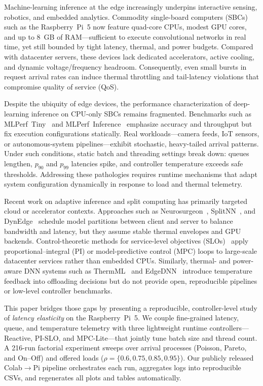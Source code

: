 \documentclass[acmsmall]{acmart}
\begin{document}
Machine-learning inference at the edge increasingly underpins interactive sensing, robotics, and embedded analytics. Commodity single-board computers (SBCs) such as the Raspberry~Pi~5 now feature quad-core CPUs, modest GPU cores, and up to 8~GB of RAM—sufficient to execute convolutional networks in real time, yet still bounded by tight latency, thermal, and power budgets. Compared with datacenter servers, these devices lack dedicated accelerators, active cooling, and dynamic voltage/frequency headroom. Consequently, even small bursts in request arrival rates can induce thermal throttling and tail-latency violations that compromise quality of service (QoS).

Despite the ubiquity of edge devices, the performance characterization of deep-learning inference on CPU-only SBCs remains fragmented. Benchmarks such as MLPerf~Tiny~\cite{banbury2021mlperf} and MLPerf~Inference~\cite{reddi2020mlperf} emphasize accuracy and throughput but fix execution configurations statically. Real workloads—camera feeds, IoT sensors, or autonomous-system pipelines—exhibit stochastic, heavy-tailed arrival patterns. Under such conditions, static batch and threading settings break down: queues lengthen, $p_{90}$ and $p_{99}$ latencies spike, and controller temperature exceeds safe thresholds. Addressing these pathologies requires runtime mechanisms that adapt system configuration dynamically in response to load and thermal telemetry.

Recent work on adaptive inference and split computing has primarily targeted cloud or accelerator contexts. Approaches such as Neurosurgeon~\cite{kang2017neurosurgeon}, SplitNN~\cite{matsubara2022split}, and DynEdge~\cite{li2022dynedge} schedule model partitions between client and server to balance bandwidth and latency, but they assume stable thermal envelopes and GPU backends. Control-theoretic methods for service-level objectives (SLOs)~\cite{gan2019sage,lopez2020pi,mao2021elastic} apply proportional–integral (PI) or model-predictive control (MPC) loops to large-scale datacenter services rather than embedded CPUs. Similarly, thermal- and power-aware DNN systems such as ThermML~\cite{sun2021thermml} and EdgeDNN~\cite{liu2020edgednn} introduce temperature feedback into offloading decisions but do not provide open, reproducible pipelines or low-level controller benchmarks.

This paper bridges those gaps by presenting a reproducible, controller-level study of \emph{latency elasticity} on the Raspberry~Pi~5. We couple fine-grained latency, queue, and temperature telemetry with three lightweight runtime controllers—Reactive, PI-SLO, and MPC-Lite—that jointly tune batch size and thread count. A 216-run factorial experiment sweeps over arrival processes (Poisson, Pareto, and On–Off) and offered loads ($\rho{=}\{0.6,0.75,0.85,0.95\}$). Our publicly released Colab$\rightarrow$Pi pipeline orchestrates each run, aggregates logs into reproducible CSVs, and regenerates all plots and tables automatically. 
\end{document}
